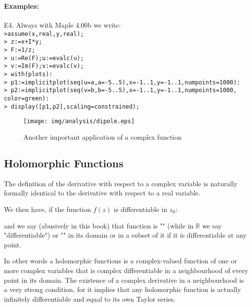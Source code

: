 	\begin{tcolorbox}[colframe=black,colback=white,sharp corners,breakable]
	\textbf{{\Large {}}Examples:}\\\\
	E4. Always with Maple 4.00b we write:\\
	
	\texttt{>assume(x,real,y,real);}\\
	\texttt{> z:=x+I*y;}\\
	\texttt{> F:=1/z;}\\
	\texttt{> u:=Re(F);u:=evalc(u);}\\
	\texttt{> v:=Im(F);v:=evalc(v);}\\
	\texttt{> with(plots):}\\
	\texttt{> p1:=implicitplot({seq(u=a,a=-5..5)},x=-1..1,y=-1..1,numpoints=1000):}\\
	\texttt{> p2:=implicitplot({seq(v=b,b=-5..5)},x=-1..1,y=-1..1,numpoints=1000,}\\
	\texttt{color=green):}\\
	\texttt{> display([p1,p2],scaling=constrained);}\\
	\begin{figure}[H]
		\begin{center}
			\texttt{[image: img/analysis/dipole.eps]}
		\end{center}	
		\caption[]{Another important application of a complex function}
	\end{figure}
	\end{tcolorbox}
	
	\subsection{Holomorphic Functions}\label{holomorphic functions}
	The definition of the derivative with respect to a complex variable is naturally formally identical to the derivative with respect to a real variable.
	
	We then have, if the function $f(z)$ is differentiable in $z_0$:
	
	and we say (abusively in this book) that function is "" (while in $\mathbb{R}$ we say "differentiable") or "" in its domain or in a subset of it if it is differentiable at any point.
	
	In other words a holomorphic functions is a complex-valued function of one or more complex variables that is complex differentiable in a neighbourhood of every point in its domain. The existence of a complex derivative in a neighbourhood is a very strong condition, for it implies that any holomorphic function is actually infinitely differentiable and equal to its own Taylor series.
	
